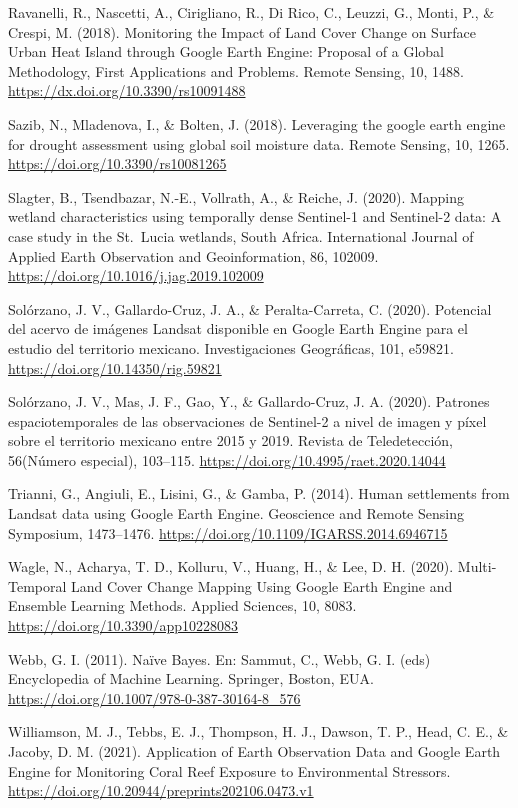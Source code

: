 \documentclass[
  12pt,
  letterpaper,
  twoside]{book}
\begin{document}
Ravanelli, R., Nascetti, A., Cirigliano, R., Di Rico, C., Leuzzi, G., Monti, P., \& Crespi, M. (2018). Monitoring the Impact of Land Cover Change on Surface Urban Heat Island through Google Earth Engine: Proposal of a Global Methodology, First Applications and Problems. Remote Sensing, 10, 1488. \url{https://dx.doi.org/10.3390/rs10091488}

Sazib, N., Mladenova, I., \& Bolten, J. (2018). Leveraging the google earth engine for drought assessment using global soil moisture data. Remote Sensing, 10, 1265. \url{https://doi.org/10.3390/rs10081265}

Slagter, B., Tsendbazar, N.-E., Vollrath, A., \& Reiche, J. (2020). Mapping wetland characteristics using temporally dense Sentinel-1 and Sentinel-2 data: A case study in the St.~Lucia wetlands, South Africa. International Journal of Applied Earth Observation and Geoinformation, 86, 102009. \url{https://doi.org/10.1016/j.jag.2019.102009}

Solórzano, J. V., Gallardo-Cruz, J. A., \& Peralta-Carreta, C. (2020). Potencial del acervo de imágenes Landsat disponible en Google Earth Engine para el estudio del territorio mexicano. Investigaciones Geográficas, 101, e59821. \url{https://doi.org/10.14350/rig.59821}

Solórzano, J. V., Mas, J. F., Gao, Y., \& Gallardo-Cruz, J. A. (2020). Patrones espaciotemporales de las observaciones de Sentinel-2 a nivel de imagen y píxel sobre el territorio mexicano entre 2015 y 2019. Revista de Teledetección, 56(Número especial), 103--115. \url{https://doi.org/10.4995/raet.2020.14044}

Trianni, G., Angiuli, E., Lisini, G., \& Gamba, P. (2014). Human settlements from Landsat data using Google Earth Engine. Geoscience and Remote Sensing Symposium, 1473--1476. \url{https://doi.org/10.1109/IGARSS.2014.6946715}

Wagle, N., Acharya, T. D., Kolluru, V., Huang, H., \& Lee, D. H. (2020). Multi-Temporal Land Cover Change Mapping Using Google Earth Engine and Ensemble Learning Methods. Applied Sciences, 10, 8083. \url{https://doi.org/10.3390/app10228083}

Webb, G. I. (2011). Naïve Bayes. En: Sammut, C., Webb, G. I. (eds) Encyclopedia of Machine Learning. Springer, Boston, EUA. \url{https://doi.org/10.1007/978-0-387-30164-8_576}

Williamson, M. J., Tebbs, E. J., Thompson, H. J., Dawson, T. P., Head, C. E., \& Jacoby, D. M. (2021). Application of Earth Observation Data and Google Earth Engine for Monitoring Coral Reef Exposure to Environmental Stressors. \url{https://doi.org/10.20944/preprints202106.0473.v1}
\end{document}

